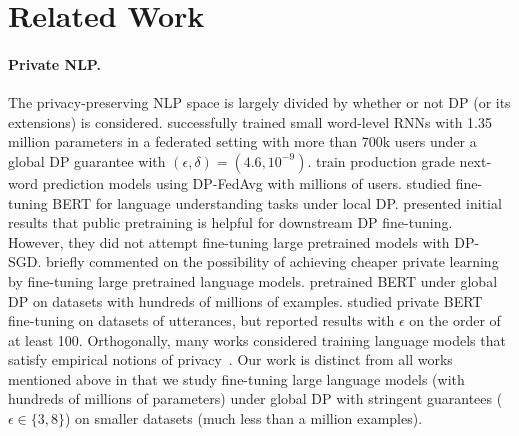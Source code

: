 \section{Related Work}

\paragraph{Private NLP.}
The privacy-preserving NLP space is largely divided by whether or not DP (or its extensions) is considered.
\cite{mcmahan2017learning} successfully trained small word-level RNNs with 1.35 million parameters in a federated setting with more than 700k users under a global DP guarantee with $(\epsilon, \delta) = (4.6, 10^{-9})$.
\cite{ramaswamy2020training} train production grade next-word prediction models using DP-FedAvg with millions of users.
\cite{qu2021privacy} studied fine-tuning BERT for language understanding tasks under local DP. 
\cite{kerrigan2020differentially} presented initial results that public pretraining is helpful for downstream DP fine-tuning.
However, they did not attempt fine-tuning large pretrained models with DP-SGD.
\cite{bommasani2021opportunities} briefly commented on the possibility of achieving cheaper private learning by fine-tuning large pretrained language models. 
\cite{anil2021large} pretrained BERT under global DP on datasets with hundreds of millions of examples. 
\cite{dupuy2021efficient} studied private BERT fine-tuning on datasets of utterances, but reported results with $\epsilon$ on the order of at least 100. 
Orthogonally, many works considered training language models that satisfy empirical notions of privacy~\citep{xu2021utilitarian,coavoux2018privacy,mireshghallah2021privacy,melamud2019towards}.
Our work is distinct from all works mentioned above in that we study fine-tuning large language models (with hundreds of millions of parameters) under global DP with stringent guarantees ($\epsilon \in \{3, 8\}$) on smaller datasets (much less than a million examples).

